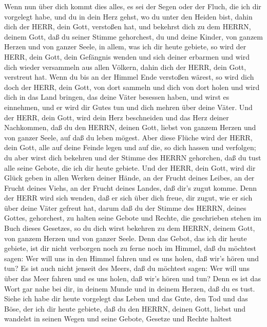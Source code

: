  Wenn nun über dich kommt dies alles, es sei der Segen oder
der Fluch, die ich dir vorgelegt habe, und du in dein Herz gehst, wo du
unter den Heiden bist, dahin dich der HERR, dein Gott, verstoßen hat,
 und bekehrst dich zu dem HERRN, deinem Gott, daß du seiner
Stimme gehorchest, du und deine Kinder, von ganzem Herzen und von ganzer
Seele, in allem, was ich dir heute gebiete,  so wird der
HERR, dein Gott, dein Gefängnis wenden und sich deiner erbarmen und wird
dich wieder versammeln aus allen Völkern, dahin dich der HERR, dein
Gott, verstreut hat.  Wenn du bis an der Himmel Ende
verstoßen wärest, so wird dich doch der HERR, dein Gott, von dort
sammeln und dich von dort holen  und wird dich in das Land
bringen, das deine Väter besessen haben, und wirst es einnehmen, und er
wird dir Gutes tun und dich mehren über deine Väter.  Und
der HERR, dein Gott, wird dein Herz beschneiden und das Herz deiner
Nachkommen, daß du den HERRN, deinen Gott, liebst von ganzem Herzen und
von ganzer Seele, auf daß du leben mögest.  Aber diese
Flüche wird der HERR, dein Gott, alle auf deine Feinde legen und auf
die, so dich hassen und verfolgen;  du aber wirst dich
bekehren und der Stimme des HERRN gehorchen, daß du tust alle seine
Gebote, die ich dir heute gebiete.  Und der HERR, dein Gott,
wird dir Glück geben in allen Werken deiner Hände, an der Frucht deines
Leibes, an der Frucht deines Viehs, an der Frucht deines Landes, daß
dir's zugut komme. Denn der HERR wird sich wenden, daß er sich über dich
freue, dir zugut, wie er sich über deine Väter gefreut hat,
 darum daß du der Stimme des HERRN, deines Gottes,
gehorchest, zu halten seine Gebote und Rechte, die geschrieben stehen im
Buch dieses Gesetzes, so du dich wirst bekehren zu dem HERRN, deinem
Gott, von ganzem Herzen und von ganzer Seele.  Denn das
Gebot, das ich dir heute gebiete, ist dir nicht verborgen noch zu ferne
 noch im Himmel, daß du möchtest sagen: Wer will uns in den
Himmel fahren und es uns holen, daß wir's hören und tun? 
Es ist auch nicht jenseit des Meers, daß du möchtest sagen: Wer will uns
über das Meer fahren und es uns holen, daß wir's hören und tun?
 Denn es ist das Wort gar nahe bei dir, in deinem Munde und
in deinem Herzen, daß du es tust.  Siehe ich habe dir heute
vorgelegt das Leben und das Gute, den Tod und das Böse, 
der ich dir heute gebiete, daß du den HERRN, deinen Gott, liebst und
wandelst in seinen Wegen und seine Gebote, Gesetze und Rechte haltest
